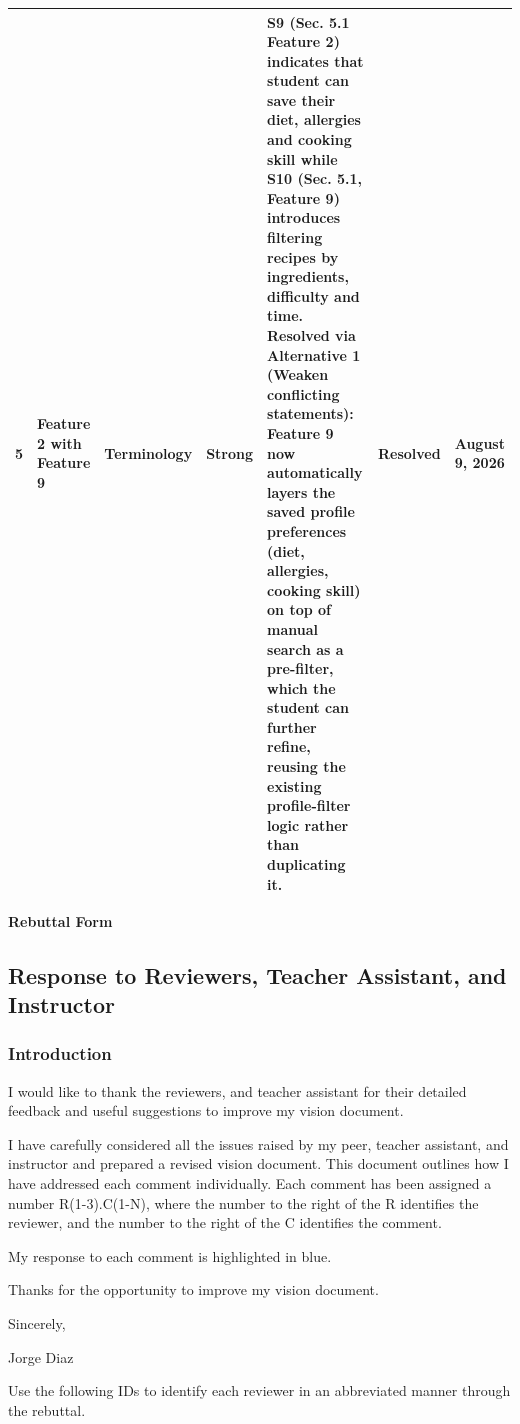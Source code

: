 \documentclass[10pt,letterpaper]{article}
\begin{document}
\begin{longtable}{|c|p{2.3cm}|p{1.7cm}|p{1.1cm}|p{4.6cm}|p{1.4cm}|p{1.6cm}|}
5 & Feature 2 with Feature 9 & Terminology & Strong & \textbf{S9} (Sec. 5.1 Feature 2) indicates that student can save their diet, allergies and cooking skill while \textbf{S10} (Sec. 5.1, Feature 9) introduces filtering recipes by ingredients, difficulty and time. Resolved via Alternative 1 (Weaken conflicting statements): Feature 9 now automatically layers the saved profile preferences (diet, allergies, cooking skill) on top of manual search as a pre-filter, which the student can further refine, reusing the existing profile-filter logic rather than duplicating it. & Resolved & August 9, 2026 \\
\hline

\end{longtable}


\newpage

\begin{center}
    {\fontsize{24}{28}\selectfont\bfseries Rebuttal Form}\\[0.5em]
\end{center}

\subsection*{Response to Reviewers, Teacher Assistant, and Instructor}

\subsubsection*{Introduction}

I would like to thank the reviewers, and teacher assistant for their detailed feedback and useful suggestions to improve my vision document.

I have carefully considered all the issues raised by my peer, teacher assistant, and instructor and prepared a revised vision document. This document outlines how I have addressed each comment individually. Each comment has been assigned a number R(1-3).C(1-N), where the number to the right of the R identifies the reviewer, and the number to the right of the C identifies the comment.

My response to each comment is highlighted in blue.

Thanks for the opportunity to improve my vision document.

Sincerely,

Jorge Diaz

Use the following IDs to identify each reviewer in an abbreviated manner through the rebuttal.
\end{document}
